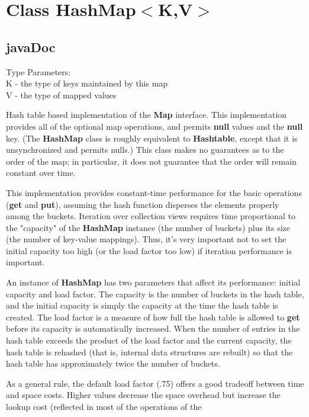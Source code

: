 \documentclass[UTF8,11pt]{ctexbook}
\newcommand{\bold}[1]{\textbf{#1}}
\begin{document}
	\chapter{Class HashMap$<$K,V$>$}
	\section{javaDoc}
	
	Type Parameters:\\
	K - the type of keys maintained by this map\\
	V - the type of mapped values
	\par	
	Hash table based implementation of the \bold{Map} interface. This implementation provides all of the optional map operations,
	and permits \bold{null} values and the \bold{null} key. (The \bold{HashMap} class is roughly equivalent to \bold{Hashtable},
	except that it is unsynchronized and permits nulls.) This class makes no guarantees as to the order of the map; in particular, 
	it does not guarantee that the order will remain constant over time.
	\par
	This implementation provides constant-time performance for the basic operations (\bold{get} and \bold{put}),
	assuming the hash function disperses the elements properly among the buckets. Iteration over collection views
	requires time proportional to the "capacity" of the \bold{HashMap} instance (the number of buckets) plus its
	size (the number of key-value mappings). Thus, it's very important not to set the initial capacity too high
	(or the load factor too low) if iteration performance is important.
	\par
	An instance of \bold{HashMap} has two parameters that affect its performance: initial capacity and load factor.
	The capacity is the number of buckets in the hash table, and the initial capacity is simply the capacity at the
	time the hash table is created. The load factor is a measure of how full the hash table is allowed to \bold{get}
	before its capacity is automatically increased. When the number of entries in the hash table exceeds the 
	product of the load factor and the current capacity, the hash table is rehashed (that is, internal data 
	structures are rebuilt) so that the hash table has approximately twice the number of buckets.
	\par
	As a general rule, the default load factor (.75) offers a good tradeoff between time and space costs. Higher 
	values decrease the space overhead but increase the lookup cost (reflected in most of the operations of the 
\end{document}

